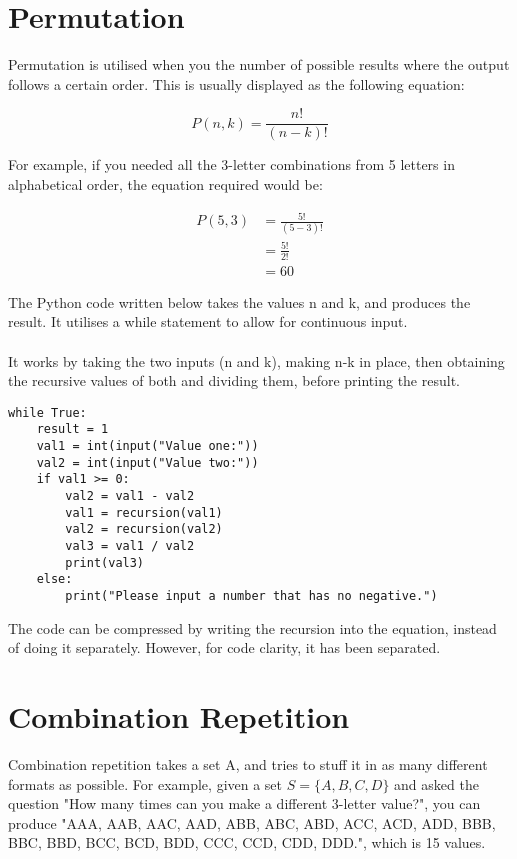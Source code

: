 \documentclass{article}
\begin{document}
	\section{Permutation}
	
	Permutation is utilised when you the number of possible results
	where the output follows a certain order.
	This is usually displayed as the following equation:

	\begin{equation*}
	P(n,k) = \frac{n!}{(n-k)!}
	\end{equation*}
	
	For example, if you needed all the 3-letter combinations from 5 letters in alphabetical order, the
	equation required would be:
	
	\begin{align*}
	P(5,3) & = \frac{5!}{(5-3)!}\\
	& = \frac{5!}{2!}\\
	& = 60
	\end{align*}
	
	The Python code written below takes the values n and k, and produces
	the result. It utilises a while statement to allow for continuous input.
	
	\paragraph{}
	It works by taking the two inputs (n and k), making n-k in place, then obtaining
	the recursive values of both and dividing them, before printing the result.
	
	\begin{verbatim}
while True:
	result = 1
	val1 = int(input("Value one:"))
	val2 = int(input("Value two:"))
	if val1 >= 0:
		val2 = val1 - val2
		val1 = recursion(val1)
		val2 = recursion(val2)
		val3 = val1 / val2
		print(val3)
	else:
		print("Please input a number that has no negative.")
	\end{verbatim}
	
	The code can be compressed by writing the recursion into the equation, instead of doing it separately.
	However, for code clarity, it has been separated.
	
	
	\section{Combination Repetition}
	
	Combination repetition takes a set A, and tries to stuff it in as many different formats as possible.
	For example, given a set $S=\{A,B,C,D\}$ and asked the question "How many times can you make a different 3-letter value?",
	you can produce "AAA, AAB, AAC, AAD, ABB, ABC, ABD, ACC, ACD, ADD, BBB, BBC, BBD, BCC, BCD, BDD, CCC, CCD, CDD, DDD.", which is 15 values.
\end{document}
